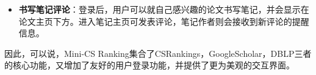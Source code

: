 \begin{itemize}
\item {\bf 书写笔记评论}：登录后，用户可以就自己感兴趣的论文书写笔记，并会显示在论文主页下方。进入笔记主页可发表评论，笔记作者则会接收到新评论的提醒信息。

\begin{figure}[h]
\centering
{}
\end{figure}

\end{itemize}

因此，可以说，Mini-CS Ranking集合了CSRankings，GoogleScholar，DBLP三者的核心功能，又增加了友好的用户登录功能，并提供了更为美观的交互界面。



